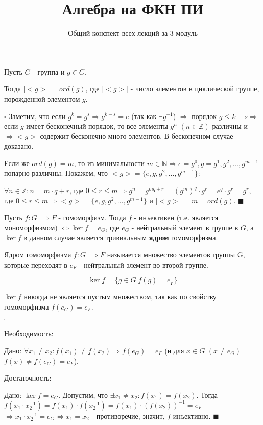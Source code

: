 \documentclass[a4paper,11pt]{article}
\title{Алгебра на ФКН ПИ}
\author{Общий конспект всех лекций за 3 модуль}
\newcommand{\stmnt}[1]{\fbox{\textbf{#1}}}
\newcommand{\void}{\vspace{\baselineskip}}
\newcommand{\N}{\mathbb{N}}
\newcommand{\Z}{\mathbb{Z}}
\newcommand{\abs}[1]{\vert #1\vert}
\begin{document}
    \maketitle

    \stmnt{Утв} Пусть $G$ - группа и $g\in G$.

    Тогда $\abs{<g>} = ord(g)$, где $\abs{<g>}$ - число элементов в циклической группе, порожденной элементом $g$.

    \void
    $\square$ Заметим, что если $g^k = g^s \Rightarrow g^{k-s} = e$ (так как $\exists g^{-1}$) $\Rightarrow$
    порядок $g \leq k - s \Rightarrow$ если $g$ имеет бесконечный порядок, то все элементы $g^n$ $(n\in\Z)$
    различны и $\Rightarrow <g>$ содержит бесконечно много элементов. В бесконечном случае доказано.
    
    \void
    Если же $ord(g) = m$, то из минимальности $m\in\N \Rightarrow e=g^0, g=g^1, g^2,\dots,g^{m-1}$ попарно
    различны. Покажем, что $<g> = \{e, g, g^2,\dots,g^{m-1}\}$:

    $\forall n\in\Z: n = m\cdot q + r$, где $0\leq r \le m \Rightarrow g^n = g^{mq+r} = (g^m)^q\cdot g^r =
    e^q\cdot g^r = g^r$, где $0\leq r\le m \Rightarrow <g> = \{e,g,g^2,\dots,g^{m-1}\}$
    и $\abs{<g>} = m = ord(g)$. $\blacksquare$

    \void
    \stmnt{Утв} Пусть $f: G\implies F$ - гомоморфизм. Тогда $f$ - инъективен (т.е. является мономорфизмом)
    $\Leftrightarrow \ker{f} = e_G$, где $e_G$ - нейтральный элемент в группе в $G$, а $\ker{f}$ в данном
    случае является тривиальным \textbf{ядром} гомоморфизма.

    \void
    \stmnt{Опр} Ядром гомоморфизма $f: G\implies F$ называется множество элементов группы G, которые переходят
    в $e_F$ - нейтральный элемент во второй группе.

    $$\ker{f} = \{g\in G\vert f(g) = e_F\}$$

    \void
    \stmnt{Зам} $\ker{f}$ никогда не является пустым множеством, так как по свойству гомоморфизма $f(e_G) = e_F$.

    \void
    $\square$

    \fbox{$\Rightarrow$} Необходимость:

    Дано: $\forall x_1 \neq x_2: f(x_1)\neq f(x_2)\Rightarrow f(e_G) = e_F$ 
    (и для $x\in G$ $(x\neq e_G)$ $f(x)\neq f(e_G) = e_F$).

    \fbox{$\Leftarrow$} Достаточность:

    Дано: $\ker{f} = e_G$. Допустим, что $\exists x_1\neq x_2: f(x_1) = f(x_2)$.
    Тогда $f(x_1\cdot x_2^{-1}) = f(x_1)\cdot f(x_2^{-1}) = f(x_1)\cdot(f(x_2))^{-1} = e_F$
    $\Rightarrow x_1\cdot x_2^{-1} = e_G \Leftrightarrow x_1 = x_2$ - противоречие, значит,
    $f$ инъективно. $\blacksquare$
\end{document}
